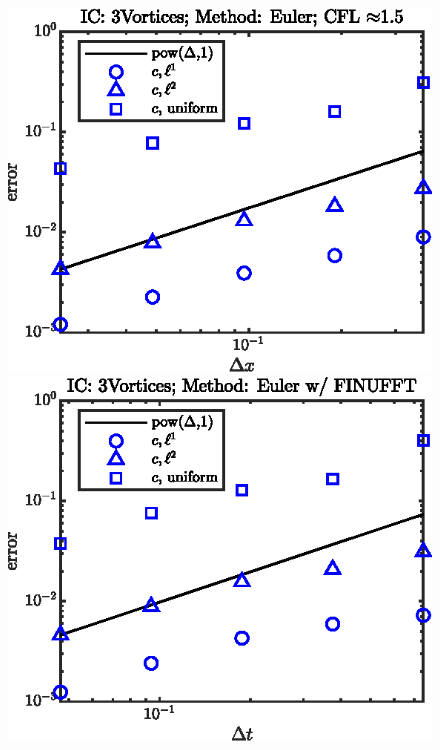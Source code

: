 \documentclass[11pt,letterpaper]{article}
\begin{document}
\begin{figure}[H]
    \includegraphics{figs/nonlin_conv_order_3Vortices_Euler}
    \includegraphics{figs/nonlin_conv_order_3Vortices_finu_Euler}
    \caption{}\label{fig:nonlin_conv_order_Taylor_Euler}
\end{figure}
\end{document}
